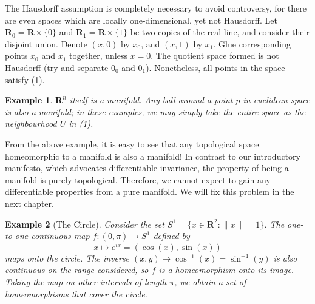 \documentclass[12pt]{report}
\theoremstyle{plain}
\newtheorem*{example}{Example}
\theoremstyle{definition}
\begin{document}
The Hausdorff assumption is completely necessary to avoid controversy, for there are even spaces which are locally one-dimensional, yet not Hausdorff. Let $\mathbf{R}_0 = \mathbf{R} \times \{0\}$ and $\mathbf{R}_1 = \mathbf{R} \times \{1\}$ be two copies of the real line, and consider their disjoint union. Denote $(x,0)$ by $x_0$, and $(x,1)$ by $x_1$. Glue corresponding points $x_0$ and $x_1$ together, unless $x = 0$. The quotient space formed is not Hausdorff (try and separate $0_0$ and $0_1$). Nonetheless, all points in the space satisfy (1).


\begin{example}
    $\mathbf{R}^n$ itself is a manifold. Any ball around a point $p$ in euclidean space is also a manifold; in these examples, we may simply take the entire space as the neighbourhood $U$ in (1).
\end{example}

From the above example, it is easy to see that any topological space homeomorphic to a manifold is also a manifold! In contrast to our introductory manifesto, which advocates differentiable invariance, the property of being a manifold is purely topological. Therefore, we cannot expect to gain any differentiable properties from a pure manifold. We will fix this problem in the next chapter.

\begin{example}[The Circle]
    Consider the set $S^1 = \{ x \in \mathbf{R}^2 : \|x\| = 1 \}$. The one-to-one continuous map $f: (0, \pi) \to S^1$ defined by
    \[ x \mapsto e^{ix} = (\cos (x), \sin (x)) \]
    maps onto the circle. The inverse $(x,y) \mapsto \cos^{-1}(x) = \sin^{-1}(y)$ is also continuous on the range considered, so $f$ is a homeomorphism onto its image. Taking the map on other intervals of length $\pi$, we obtain a set of homeomorphisms that cover the circle.
\end{example}
\end{document}
